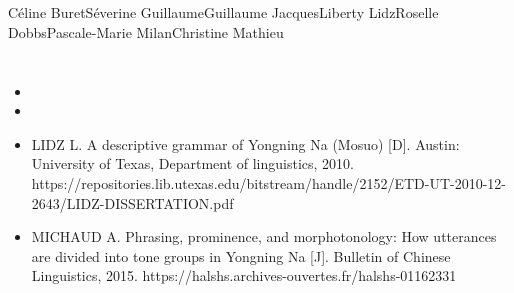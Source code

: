 	\section{ } \label{sec:thks}
	
Céline BuretSéverine GuillaumeGuillaume JacquesLiberty LidzRoselle DobbsPascale-Marie MilanChristine Mathieu




	\section{ } \label{sec:refs}
	\begin{itemize}
		\item {}
		\item {}
		\item LIDZ L. A descriptive grammar of Yongning Na (Mosuo) [D]. Austin: University of Texas, Department of linguistics, 2010.
		https://repositories.lib.utexas.edu/bitstream/handle/2152/ETD-UT-2010-12-2643/LIDZ-DISSERTATION.pdf
		\item MICHAUD A. Phrasing, prominence, and morphotonology: How utterances are divided into tone groups in Yongning Na [J]. Bulletin of Chinese Linguistics, 2015. https://halshs.archives-ouvertes.fr/halshs-01162331
	\end{itemize}

\cleardoublepage
 

	

